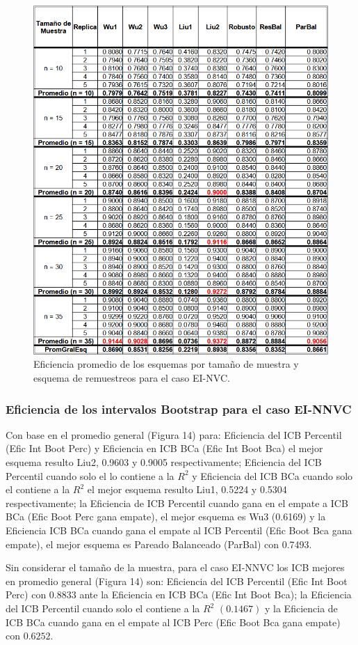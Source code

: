 \begin{figure}[ht] 
	\centering 
	\includegraphics[width=0.70\linewidth]{img/EI_NVC_Efic_Esq.png} 
	\caption{Eficiencia promedio de los esquemas por tamaño de muestra y esquema de remuestreos para el caso EI-NVC.} 
	\label{fig:EI_NVC_Esq}
\end{figure}
\FloatBarrier



\subsubsection{Eficiencia de los intervalos Bootstrap para el caso EI-NNVC}
Con base en el promedio general (Figura 14) para: Eficiencia del ICB Percentil (Efic Int Boot Perc) y Eficiencia en ICB BCa (Efic Int Boot Bca) el mejor esquema resulto Liu2, 0.9603 y 0.9005 respectivamente;
 Eficiencia del ICB Percentil cuando solo el lo contiene a la $R^{2}$ y Eficiencia del ICB BCa cuando solo el contiene a la $R^{2}$ el mejor esquema resulto Liu1, 0.5224 y 0.5304 respectivamente; la Eficiencia de ICB Percentil cuando gana en el empate a ICB BCa (Efic Boot Perc gana empate), el mejor esquema es Wu3 (0.6169) y la Eficiencia ICB BCa cuando gana el empate al ICB Percentil (Efic Boot Bca gana empate), el mejor esquema es Pareado Balanceado (ParBal) con 0.7493.
\vspace{.5cm}

Sin considerar el tamaño de la muestra, para el caso EI-NNVC los ICB mejores en promedio general (Figura 14) son: Eficiencia del ICB Percentil (Efic Int Boot Perc) con $0.8833$ ante la Eficiencia en ICB BCa (Efic Int Boot Bca); la Eficiencia del ICB Percentil cuando solo el contiene a la $R^{2}$ $(0.1467)$ y la Eficiencia de ICB BCa cuando gana en el empate al ICB Perc (Efic Boot Bca gana empate) con $0.6252$.


